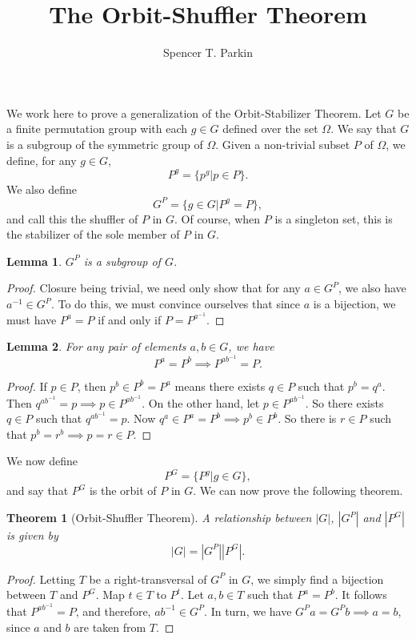 \documentclass[12pt]{article}
\title{The Orbit-Shuffler Theorem}
\author{Spencer T. Parkin}
\newtheorem{theorem}{Theorem}[section]
\newtheorem{lemma}{Lemma}[section]
\begin{document}
\maketitle

We work here to prove a generalization of the Orbit-Stabilizer Theorem.
Let $G$ be a finite permutation group with each $g\in G$ defined over the set $\Omega$.
We say that $G$ is a subgroup of the symmetric group of $\Omega$.
Given a non-trivial subset $P$ of $\Omega$, we define, for any $g\in G$,
\begin{equation*}
P^g = \{p^g|p\in P\}.
\end{equation*}
We also define
\begin{equation*}
G^P = \{g\in G|P^g=P\},
\end{equation*}
and call this the shuffler of $P$ in $G$.  Of course, when $P$ is a singleton set,
this is the stabilizer of the sole member of $P$ in $G$.

\begin{lemma}
$G^P$ is a subgroup of $G$.
\end{lemma}
\begin{proof}
Closure being trivial, we need only show that for any $a\in G^P$, we also have
$a^{-1}\in G^P$.  To do this, we must convince ourselves that since $a$ is a bijection,
we must have $P^a=P$ if and only if $P=P^{a^{-1}}$.
\end{proof}

\begin{lemma}
For any pair of elements $a,b\in G$, we have
\begin{equation*}
P^a=P^b\implies P^{ab^{-1}}=P.
\end{equation*}
\end{lemma}
\begin{proof}
If $p\in P$, then $p^b\in P^b=P^a$ means there exists $q\in P$
such that $p^b=q^a$.  Then $q^{ab^{-1}}=p\implies p\in P^{ab^{-1}}$.
On the other hand, let $p\in P^{ab^{-1}}$.  So there exists $q\in P$ such
that $q^{ab^{-1}}=p$.  Now $q^a\in P^a=P^b\implies p^b\in P^b$.
So there is $r\in P$ such that $p^b=r^b\implies p=r\in P$.
\end{proof}

We now define
\begin{equation*}
P^G = \{P^g|g\in G\},
\end{equation*}
and say that $P^G$ is the orbit of $P$ in $G$.
We can now prove the following theorem.
\begin{theorem}[Orbit-Shuffler Theorem]
A relationship between $|G|$, $|G^P|$ and $|P^G|$ is given by
\begin{equation*}
|G|=|G^P||P^G|.
\end{equation*}
\end{theorem}
\begin{proof}
Letting $T$ be a right-transversal of $G^P$ in $G$, we simply find a bijection
between $T$ and $P^G$.  Map $t\in T$ to $P^t$.  Let $a,b\in T$ such that
$P^a=P^b$.  It follows that $P^{ab^{-1}}=P$, and therefore, $ab^{-1}\in G^P$.
In turn, we have $G^Pa=G^Pb\implies a=b$, since $a$ and $b$ are taken from $T$.
\end{proof}
\end{document}
